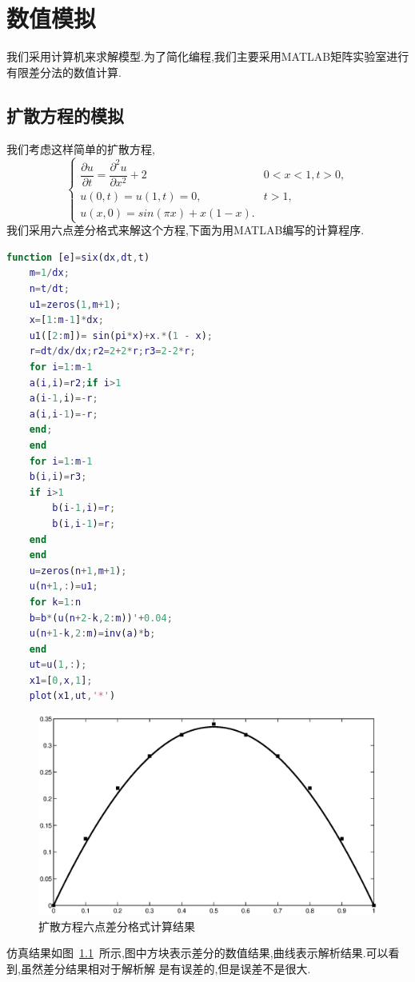 \chapter{数值模拟}
我们采用计算机来求解模型.为了简化编程,我们主要采用MATLAB矩阵实验室进行有限差分法的数值计算.\par
\section{扩散方程的模拟}
我们考虑这样简单的扩散方程,
\begin{equation}
\begin{cases}
\dfrac{\partial u}{\partial t}=\dfrac{\partial^2 u}{\partial x^2}+2 & 0<x<1,t>0, \\
u(0,t)=u(1,t)=0,& t>1, \\
u(x,0)=sin(\pi x)+x(1-x).
\end{cases}
\end{equation}
我们采用六点差分格式来解这个方程,下面为用MATLAB编写的计算程序.
 \begin{lstlisting}[caption=六点差分格式,language=Matlab]
function [e]=six(dx,dt,t)
    m=1/dx;
    n=t/dt;
    u1=zeros(1,m+1);
    x=[1:m-1]*dx;
    u1([2:m])= sin(pi*x)+x.*(1 - x);
    r=dt/dx/dx;r2=2+2*r;r3=2-2*r;
    for i=1:m-1
	a(i,i)=r2;if i>1
	a(i-1,i)=-r;
	a(i,i-1)=-r;
	end;
    end
    for i=1:m-1
	b(i,i)=r3;
	if i>1
	    b(i-1,i)=r;
	    b(i,i-1)=r;
	end
    end
    u=zeros(n+1,m+1);
    u(n+1,:)=u1;
    for k=1:n
	b=b*(u(n+2-k,2:m))'+0.04;
	u(n+1-k,2:m)=inv(a)*b;
    end
    ut=u(1,:);
    x1=[0,x,1];
    plot(x1,ut,'*')
\end{lstlisting}
\begin{figure}[h]
 \centering
 \includegraphics[scale=0.5]{./pic/6dcf.eps}
 \caption{扩散方程六点差分格式计算结果\label{fig:sm_ldcf}}
\end{figure}\par
仿真结果如图~\ref{fig:sm_ldcf}~所示,图中方块表示差分的数值结果,曲线表示解析结果.可以看到,虽然差分结果相对于解析解
是有误差的,但是误差不是很大.\newpage
